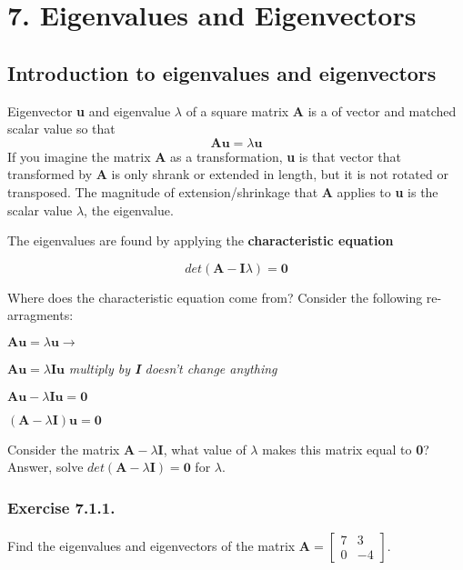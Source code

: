 \section{7. Eigenvalues and Eigenvectors}

\subsection{Introduction to eigenvalues and eigenvectors}

Eigenvector \textbf{u} and eigenvalue $\lambda$ of a square matrix \textbf{A} is a 
of vector and matched scalar value so that
$$\mathbf{Au} = \lambda\mathbf{u}
$$
If you imagine the matrix \textbf{A} as a transformation, \textbf{u} is that vector that transformed
by \textbf{A} is only shrank or extended in length, but it is not rotated or transposed.
The magnitude of extension/shrinkage that \textbf{A} applies to \textbf{u} is the
scalar value $\lambda$, the eigenvalue.

The eigenvalues are found by applying the \textbf{characteristic equation}

$$
det(\mathbf{A - I}\lambda) = \mathbf{0}
$$

Where does the characteristic equation come from? Consider the following re-arragments:

$\mathbf{Au} = \lambda\mathbf{u} \rightarrow$

$\mathbf{Au} = \lambda\mathbf{Iu}$ \emph{multiply by \textbf{I} doesn't change anything}

$\mathbf{Au} - \lambda\mathbf{Iu} = \mathbf{0}$

$(\mathbf{A} - \lambda\mathbf{I})\mathbf{u} = \mathbf{0}$ 

Consider the matrix $\mathbf{A} - \lambda\mathbf{I}$, what value of $\lambda$ makes
this matrix equal to \textbf{0}? Answer, solve $det(\mathbf{A} - \lambda\mathbf{I}) = \mathbf{0}$
for $\lambda$.

\subsubsection{Exercise 7.1.1.}

Find the eigenvalues and eigenvectors of the matrix
$\mathbf{A} = \left[\begin{matrix}7 & 3\\0 & -4\end{matrix}\right]$.

